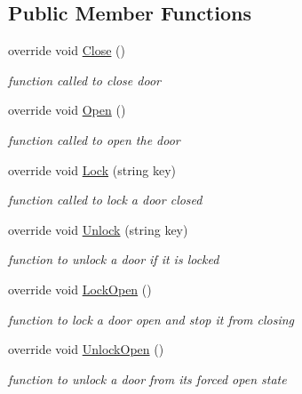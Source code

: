 \subsection*{Public Member Functions}
\begin{DoxyCompactItemize}
\item 
override void \mbox{\hyperlink{class_sliding_door_a22d2e8580503b045da48510214599746}{Close}} ()
\begin{DoxyCompactList}\small\item\em function called to close door \end{DoxyCompactList}\item 
override void \mbox{\hyperlink{class_sliding_door_aaf090e96cc143eb5ed3eaf875045efc9}{Open}} ()
\begin{DoxyCompactList}\small\item\em function called to open the door \end{DoxyCompactList}\item 
override void \mbox{\hyperlink{class_sliding_door_a2b21b6ea3181ac95520e0490c900d1a6}{Lock}} (string key)
\begin{DoxyCompactList}\small\item\em function called to lock a door closed \end{DoxyCompactList}\item 
override void \mbox{\hyperlink{class_sliding_door_a259817872880d475d54ba9721a6db5cc}{Unlock}} (string key)
\begin{DoxyCompactList}\small\item\em function to unlock a door if it is locked \end{DoxyCompactList}\item 
override void \mbox{\hyperlink{class_sliding_door_aca96469919dc50b5b3cc77cd6f4fc7d2}{Lock\+Open}} ()
\begin{DoxyCompactList}\small\item\em function to lock a door open and stop it from closing \end{DoxyCompactList}\item 
override void \mbox{\hyperlink{class_sliding_door_af3b93ba6356b95277be1913224ad1415}{Unlock\+Open}} ()
\begin{DoxyCompactList}\small\item\em function to unlock a door from it\textquotesingle{}s forced open state \end{DoxyCompactList}\end{DoxyCompactItemize}
